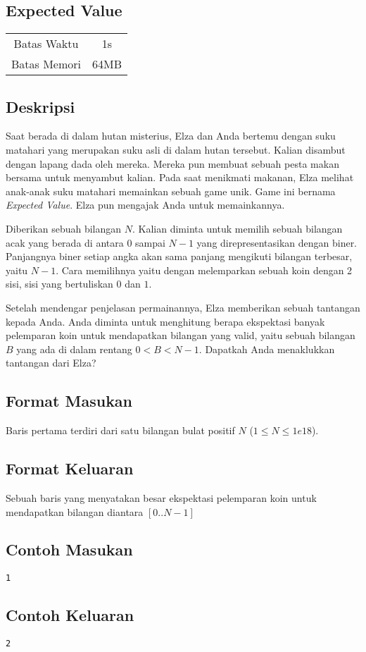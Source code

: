 \documentclass{article}
\begin{document}
\begin{center}
    \section*{Expected Value} %

    \begin{tabular}{ | c c | }
        \hline
        Batas Waktu  & 1s \\    %
        Batas Memori & 64MB \\  %
        \hline
    \end{tabular}
\end{center}

\subsection*{Deskripsi}
Saat berada di dalam hutan misterius, Elza dan Anda bertemu dengan suku matahari yang merupakan suku asli di dalam hutan tersebut.
Kalian disambut dengan lapang dada oleh mereka. Mereka pun membuat sebuah pesta makan bersama untuk menyambut kalian.
Pada saat menikmati makanan, Elza melihat anak-anak suku matahari memainkan sebuah game unik. Game ini bernama \textit{Expected Value}. Elza pun
mengajak Anda untuk memainkannya.

Diberikan sebuah bilangan $N$. Kalian diminta untuk memilih sebuah bilangan acak yang berada di antara $0$ sampai $N-1$ yang 
direpresentasikan dengan biner. Panjangnya biner setiap angka akan sama panjang mengikuti bilangan terbesar, yaitu $N-1$.
Cara memilihnya yaitu dengan melemparkan sebuah koin dengan 2 sisi, sisi yang bertuliskan $0$ dan $1$.

Setelah mendengar penjelasan permainannya, Elza memberikan sebuah tantangan kepada Anda. Anda diminta untuk menghitung berapa 
ekspektasi banyak pelemparan koin untuk mendapatkan bilangan yang valid, yaitu sebuah bilangan $B$ yang ada di dalam rentang $0 < B < N-1$. Dapatkah Anda menaklukkan tantangan dari Elza?

\subsection*{Format Masukan}
Baris pertama terdiri dari satu bilangan bulat positif $N$ ($1 \leq N \leq 1e18$).

\subsection*{Format Keluaran}
Sebuah baris yang menyatakan besar ekspektasi pelemparan koin untuk mendapatkan bilangan diantara $[0..N-1]$
\\

\begin{multicols}{2}
\subsection*{Contoh Masukan}
\begin{lstlisting}
1
\end{lstlisting}
\columnbreak
\subsection*{Contoh Keluaran}
\begin{lstlisting}
2
\end{lstlisting}
\vfill
\null
\end{multicols}


\pagebreak
\end{document}

